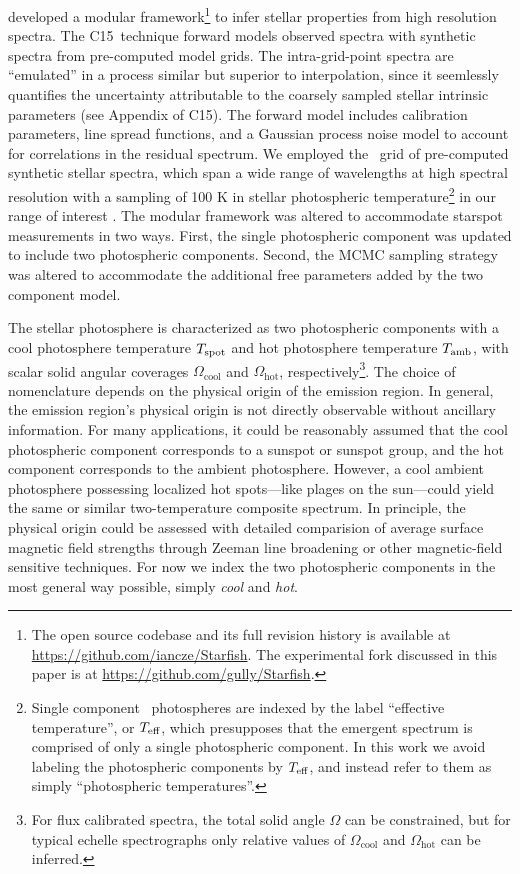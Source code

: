 \documentclass[twocolumn]{emulateapj}%
\newcommand{\iancze}{{\sc C15}}
\begin{document}
\citet[hereafter \iancze]{czekala15} developed a modular framework\footnote{The open source codebase and its full revision history is available at \url{https://github.com/iancze/Starfish}.  The experimental fork discussed in this paper is at \url{https://github.com/gully/Starfish}.  } to infer stellar properties from high resolution spectra.  The \iancze\ technique forward models observed spectra with synthetic spectra from pre-computed model grids.  The intra-grid-point spectra are ``emulated'' in a process similar but superior to interpolation, since it seemlessly quantifies the uncertainty attributable to the coarsely sampled stellar intrinsic parameters (see Appendix of \iancze).  The forward model includes calibration parameters, line spread functions, and a Gaussian process noise model to account for correlations in the residual spectrum.  We employed the \PHOENIX\ grid of pre-computed synthetic stellar spectra, which span a wide range of wavelengths at high spectral resolution with a sampling of 100 K in stellar photospheric temperature\footnote{Single component \PHOENIX\ photospheres are indexed by the label ``effective temperature'', or $T_\textrm{eff}$, which presupposes that the emergent spectrum is comprised of only a single photospheric component.  In this work we avoid labeling the photospheric components by $T_\textrm{eff}$, and instead refer to them as simply ``photospheric temperatures''.} in our range of interest \citep{husser13}.  The modular framework was altered to accommodate starspot measurements in two ways. First, the single photospheric component was updated to include two photospheric components.  Second, the MCMC sampling strategy was altered to accommodate the additional free parameters added by the two component model.  

The stellar photosphere is characterized as two photospheric components with a cool photosphere temperature $T_\textrm{spot}$ and hot photosphere temperature $T_\textrm{amb}$, with scalar solid angular coverages $\Omega_{\mathrm{cool}}$ and $\Omega_{\mathrm{hot}}$, respectively\footnote{For flux calibrated spectra, the total solid angle $\Omega$ can be constrained, but for typical echelle spectrographs only relative values of $\Omega_{\mathrm{cool}}$ and $\Omega_{\mathrm{hot}}$ can be inferred.}.  
The choice of nomenclature depends on the physical origin of the emission region.  In general, the emission region's physical origin is not directly observable without ancillary information.  For many applications, it could be reasonably assumed that the cool photospheric component corresponds to a sunspot or sunspot group, and the hot component corresponds to the ambient photosphere.  However, a cool ambient photosphere possessing localized hot spots---like plages on the sun---could yield the same or similar two-temperature composite spectrum.  In principle, the physical origin could be assessed with detailed comparision of average surface magnetic field strengths through Zeeman line broadening or other magnetic-field sensitive techniques.  For now we index the two photospheric components in the most general way possible, simply \emph{cool} and \emph{hot}. 
\end{document}
